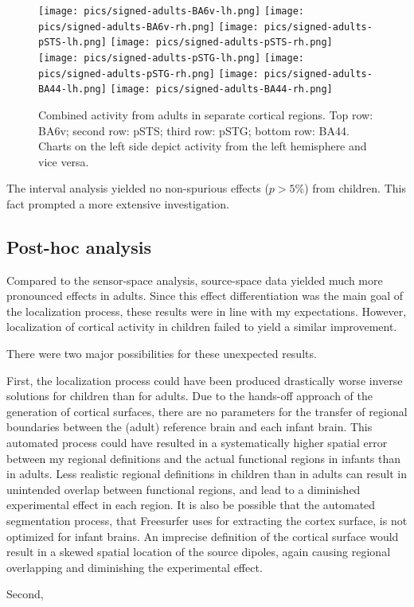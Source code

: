 \begin{figure}[h]
\begin{center}
\texttt{[image: pics/signed-adults-BA6v-lh.png]}
\texttt{[image: pics/signed-adults-BA6v-rh.png]}
\texttt{[image: pics/signed-adults-pSTS-lh.png]}
\texttt{[image: pics/signed-adults-pSTS-rh.png]}
\texttt{[image: pics/signed-adults-pSTG-lh.png]}
\texttt{[image: pics/signed-adults-pSTG-rh.png]}
\texttt{[image: pics/signed-adults-BA44-lh.png]}
\texttt{[image: pics/signed-adults-BA44-rh.png]}
\caption{\label{4.3.activity.adults.ventral} Combined activity from adults in separate cortical regions. Top row: BA6v; second row: pSTS; third row: pSTG; bottom row: BA44. Charts on the left side depict activity from the left hemisphere and vice versa.}
\end{center}
\end{figure}


The interval analysis yielded no non-spurious effects ($p > 5\%$) from children.
This fact prompted a more extensive investigation.

\subsection{Post-hoc analysis}

Compared to the sensor-space analysis, source-space data yielded much more pronounced effects in adults.
Since this effect differentiation was the main goal of the localization process, these results were in line with my expectations.
However, localization of cortical activity in children failed to yield a similar improvement.

There were two major possibilities for these unexpected results.

First, the localization process could have been produced drastically worse inverse solutions for children than for adults.
Due to the hands-off approach of the generation of cortical surfaces, there are no parameters for the transfer of regional boundaries between the (adult) reference brain and each infant brain.
This automated process could have resulted in a systematically higher spatial error between my regional definitions and the actual functional regions in infants than in adults.
Less realistic regional definitions in children than in adults can result in unintended overlap between functional regions, and lead to a diminished experimental effect in each region.
It is also be possible that the automated segmentation process, that Freesurfer uses for extracting the cortex surface, is not optimized for infant brains.
An imprecise definition of the cortical surface would result in a skewed spatial location of the source dipoles, again causing regional overlapping and diminishing the experimental effect.

Second, 

